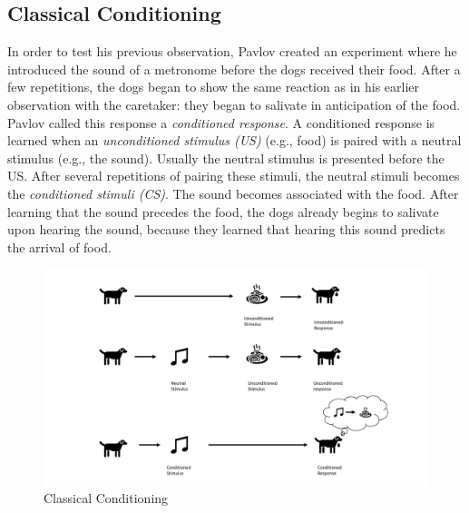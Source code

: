 \subsection{Classical Conditioning}


In order to test his previous observation, Pavlov created an experiment where he introduced the sound of a metronome before the dogs received their food. %
After a few repetitions, the dogs began to show the same reaction as in his earlier observation with the caretaker: they began to salivate in anticipation of the food.
Pavlov called this response a \emph{conditioned response}. A conditioned response is learned when an \emph{unconditioned stimulus (US)} (e.g., food) is paired with a neutral stimulus (e.g., the sound). Usually the neutral stimulus is presented before the US. After several repetitions of pairing these stimuli, the neutral stimuli becomes the \emph{conditioned stimuli (CS)}. The sound becomes associated with the food. After learning that the sound precedes the food, the dogs already begins to salivate upon hearing the sound, because they learned that hearing this sound predicts the arrival of food. %

\begin{figure}
    \centering
    \includegraphics[width=1\textwidth]{Plots/ClassicalConditioning.pdf}
    \caption{Classical Conditioning}
    \label{fig:Classical_Conditioning}
\end{figure}


